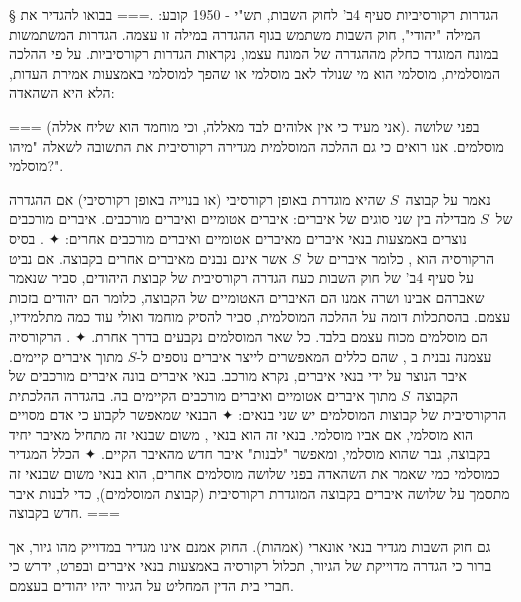 § הגדרות רקורסיביות
סעיף 4ב' לחוק השבות, תש"י - 1950 קובע:
.===
בבואו להגדיר את המילה "יהודי", חוק השבות משתמש בגוף ההגדרה במילה זו עצמה.
הגדרות המשתמשות במונח המוגדר כחלק מההגדרה של המונח עצמו, נקראות הגדרות
רקורסיביות. על פי ההלכה המוסלמית, מוסלמי הוא מי שנולד לאב מוסלמי או שהפך
למוסלמי באמצעות אמירת העדות, הלא היא השהאדה:
\begin{Arabic}
\end{Arabic}
===
(אני מעיד כי אין אלוהים לבד מאללה, וכי מוחמד הוא שליח אללה). בפני שלושה
מוסלמים. אנו רואים כי גם ההלכה המוסלמית מגדירה רקורסיבית את התשובה לשאלה "מיהו
מוסלמי?".

נאמר על קבוצה~$S$ שהיא מוגדרת באופן רקורסיבי (או בנוייה באופן רקורסיבי) אם
ההגדרה של~$S$ מבדילה בין שני סוגים של איברים: איברים אטומיים ואיברים מורכבים.
איברים מורכבים נוצרים באמצעות בנאי איברים מאיברים אטומיים ואיברים מורכבים אחרים:
✦ . בסיס הרקורסיה הוא ,
כלומר איברים של~$S$ אשר אינם נבנים מאיברים אחרים בקבוצה. אם נביט על סעיף 4ב' של
חוק השבות כעח הגדרה רקורסיבית של קבוצת היהודים, סביר שנאמר שאברהם אבינו ושרה
אמנו הם האיברים האטומיים של הקבוצה, כלומר הם יהודים בזכות עצמם. בהסתכלות דומה
על ההלכה המוסלמית, סביר להסיק מוחמד ואולי עוד כמה מתלמידיו, הם מוסלמים מכוח
עצמם בלבד. כל שאר המוסלמים נקבעים בדרך אחרת.
✦ . הרקורסיה עצמנה נבנית ב , שהם כללים
המאפשרים לייצר איברים נוספים ל-$S$ מתוך איברים קיימים. איבר הנוצר על ידי בנאי
איברים, נקרא מורכב. בנאי איברים בונה איברים מורכבים של הקבוצה~$S$ מתוך איברים
אטומיים ואיברים מורכבים הקיימים בה. בהגדרה ההלכתית הרקורסיבית של קבוצות
המוסלמים יש שני בנאים:
✦ הבנאי שמאפשר לקבוע כי אדם מסויים הוא מוסלמי, אם אביו מוסלמי. בנאי זה הוא
בנאי , משום שבנאי זה מתחיל מאיבר יחיד בקבוצה, גבר שהוא מוסלמי,
ומאפשר "לבנות" איבר חדש מהאיבר הקיים.
✦ הכלל המגדיר כמוסלמי כמי שאמר את השהאדה בפני שלושה מוסלמים אחרים, הוא
בנאי  משום שבנאי זה מתסמך על שלושה איברים בקבוצה המוגדרת רקורסיבית
(קבוצת המוסלמים), כדי לבנות איבר חדש בקבוצה.
===

גם חוק השבות מגדיר בנאי אונארי (אמהות). החוק אמנם אינו מגדיר
במדוייק מהו גיור, אך ברור כי הגדרה מדוייקת של הגיור, תכלול רקורסיה באמצעות בנאי
איברים ובפרט, ידרש כי חברי בית הדין המחליט על הגיור יהיו יהודים בעצמם.

